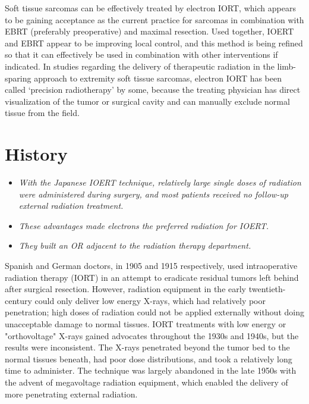 Soft tissue sarcomas can be effectively treated by electron IORT, which
appears to be gaining acceptance as the current practice for sarcomas in
combination with EBRT (preferably preoperative) and maximal resection.
Used together, IOERT and EBRT appear to be improving local control, and
this method is being refined so that it can effectively be used in
combination with other interventions if indicated. In studies regarding
the delivery of therapeutic radiation in the limb-sparing approach to
extremity soft tissue sarcomas, electron IORT has been called `precision
radiotherapy' by some, because the treating physician has direct
visualization of the tumor or surgical cavity and can manually exclude
normal tissue from the field.

\section{History}\label{history}

\begin{itemize}
\item
  \emph{With the Japanese IOERT technique, relatively large single doses
  of radiation were administered during surgery, and most patients
  received no follow-up external radiation treatment.}
\item
  \emph{These advantages made electrons the preferred radiation for
  IOERT.}
\item
  \emph{They built an OR adjacent to the radiation therapy department.}
\end{itemize}

Spanish and German doctors, in 1905 and 1915 respectively, used
intraoperative radiation therapy (IORT) in an attempt to eradicate
residual tumors left behind after surgical resection. However, radiation
equipment in the early twentieth-century could only deliver low energy
X-rays, which had relatively poor penetration; high doses of radiation
could not be applied externally without doing unacceptable damage to
normal tissues. IORT treatments with low energy or "orthovoltage" X-rays
gained advocates throughout the 1930s and 1940s, but the results were
inconsistent. The X-rays penetrated beyond the tumor bed to the normal
tissues beneath, had poor dose distributions, and took a relatively long
time to administer. The technique was largely abandoned in the late
1950s with the advent of megavoltage radiation equipment, which enabled
the delivery of more penetrating external radiation.

